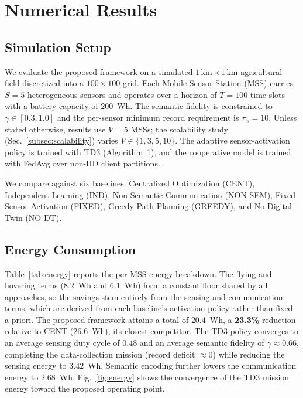 %
%

\section{Numerical Results}
\label{sec:results}

\subsection{Simulation Setup}
We evaluate the proposed framework on a simulated $1\,\text{km}\times1\,\text{km}$
agricultural field discretized into a $100\times100$ grid. Each Mobile Sensor
Station (MSS) carries $S=5$ heterogeneous sensors and operates over a horizon
of $T=100$ time slots with a battery capacity of $200$~Wh. The semantic
fidelity is constrained to $\gamma\in[0.3,1.0]$ and the per-sensor minimum
record requirement is $\pi_s=10$. Unless stated otherwise, results use $V=5$
MSSs; the scalability study (Sec.~\ref{subsec:scalability}) varies
$V\in\{1,3,5,10\}$. The adaptive sensor-activation policy is trained with TD3
(Algorithm~1), and the cooperative model is trained with FedAvg over non-IID
client partitions.

We compare against six baselines: Centralized Optimization (CENT), Independent
Learning (IND), Non-Semantic Communication (NON-SEM), Fixed Sensor Activation
(FIXED), Greedy Path Planning (GREEDY), and No Digital Twin (NO-DT).

\subsection{Energy Consumption}
\label{subsec:energy}
Table~\ref{tab:energy} reports the per-MSS energy breakdown. The flying and
hovering terms ($8.2$~Wh and $6.1$~Wh) form a constant floor shared by all
approaches, so the savings stem entirely from the sensing and communication
terms, which are derived from each baseline's activation policy rather than
fixed a priori. The proposed framework attains a total of $20.4$~Wh, a
\textbf{23.3\%} reduction relative to CENT ($26.6$~Wh), its closest competitor.
The TD3 policy converges to an average sensing duty cycle of $0.48$ and an
average semantic fidelity of $\gamma\approx0.66$, completing the data-collection
mission (record deficit $\approx 0$) while reducing the sensing energy to
$3.42$~Wh. Semantic encoding further lowers the communication energy to
$2.68$~Wh. Fig.~\ref{fig:energy}
shows the convergence of the TD3 mission energy toward the proposed operating
point.

